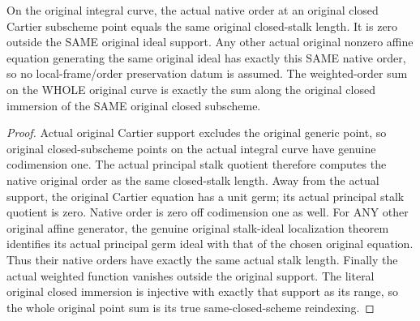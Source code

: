 \begin{theorem}
\label{thm:fc-curve-cartier-native-local-orders}
\leanok
{}
On the original integral curve, the actual native order at an original
closed Cartier subscheme point equals the same original closed-stalk
length. It is zero outside the SAME original ideal support. Any other
actual original nonzero affine equation generating the same original ideal
has exactly this SAME native order, so no local-frame/order preservation
datum is assumed. The weighted-order sum on the WHOLE original curve is
exactly the sum along the original closed immersion of the SAME original
closed subscheme.
\end{theorem}
\begin{proof}
Actual original Cartier support excludes the original generic point, so
original closed-subscheme points on the actual integral curve have genuine
codimension one. The actual principal stalk quotient therefore computes
the native original order as the same closed-stalk length. Away from the
actual support, the original Cartier equation has a unit germ; its actual
principal stalk quotient is zero. Native order is zero off codimension one
as well. For ANY other original affine generator, the genuine original
stalk-ideal localization theorem identifies its actual principal germ ideal
with that of the chosen original equation. Thus their native orders have
exactly the same actual stalk length. Finally the actual weighted function
vanishes outside the original support. The literal original closed
immersion is injective with exactly that support as its range, so the
whole original point sum is its true same-closed-scheme reindexing.
\end{proof}

